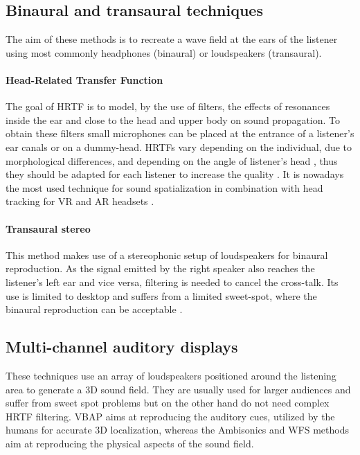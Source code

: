 \subsection{Binaural and transaural techniques}

The aim of these methods is to recreate a wave field at the ears of the listener using most commonly headphones (binaural) or loudspeakers (transaural).

\paragraph{Head-Related Transfer Function}\label{par:hrtf}
\hfill \break

The goal of \gls{HRTF} is to model, by the use of filters, the effects of resonances inside the ear and close to the head and upper body on sound propagation. To obtain these filters small microphones can be placed at the entrance of a listener's ear canals or on a dummy-head. \gls{HRTF}s vary depending on the individual, due to morphological differences, and depending on the angle of listener's head \cite{zhang2013measurement}, thus they should be adapted for each listener to increase the quality \cite{funkhouser2002sounds}. It is nowadays the most used technique for sound spatialization in combination with head tracking for \gls{VR} and \gls{AR} headsets \cite{bib:oculus, bib:hololens}. 

\paragraph{Transaural stereo}\label{par:transaural}
\hfill \break

This method makes use of a stereophonic setup of loudspeakers for binaural reproduction. As the signal emitted by the right speaker also reaches the listener's left ear and vice versa, filtering is needed to cancel the cross-talk. Its use is limited to desktop and suffers from a limited sweet-spot, where the binaural reproduction can be acceptable \cite{funkhouser2002sounds}.

\subsection{Multi-channel auditory displays}

These techniques use an array of loudspeakers positioned around the listening area to generate a 3D sound field. They are usually used for larger audiences and suffer from sweet spot problems but on the other hand do not need complex  \gls{HRTF} filtering. \gls{VBAP} aims at reproducing the auditory cues, utilized by the humans for accurate 3D localization, whereas the Ambisonics and \gls{WFS} methods aim at reproducing the physical aspects of the sound field. 

